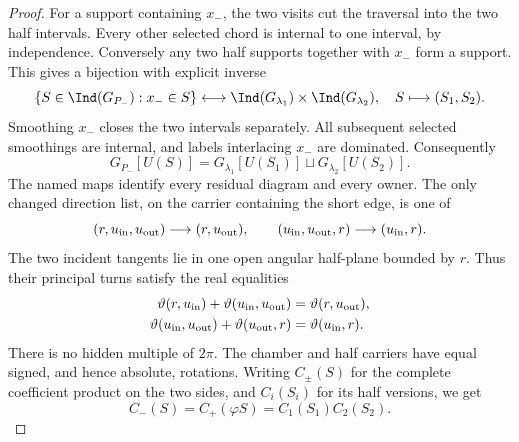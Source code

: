 \begin{proof}
For a support containing $x_-$, the two visits cut the traversal into
the two half intervals.  Every other selected chord is internal to one
interval, by independence.  Conversely any two half supports together
with $x_-$ form a support.  This gives a bijection with explicit inverse
\begin{equation}\label{s7c:sliding-bijection}
 \{S\in\Ind(G_{P_-}):x_-\in S\}\longleftrightarrow
 \Ind(G_{\lambda_1})\times\Ind(G_{\lambda_2}),
 \quad S\longmapsto(S_1,S_2).
\end{equation}
Smoothing $x_-$ closes the two intervals separately.  All subsequent
selected smoothings are internal, and labels interlacing $x_-$ are
dominated.  Consequently
\begin{equation}\label{s7c:sliding-residual}
 G_{P_-}[U(S)]
 =G_{\lambda_1}[U(S_1)]\sqcup G_{\lambda_2}[U(S_2)].
\end{equation}
The named maps identify every residual diagram and every owner.  The
only changed direction list, on the carrier containing the short edge,
is one of
\begin{equation}\label{s7c:short-direction-lists}
 (r,u_{\rm in},u_{\rm out})\longrightarrow(r,u_{\rm out}),
 \qquad
 (u_{\rm in},u_{\rm out},r)\longrightarrow(u_{\rm in},r).
\end{equation}
The two incident tangents lie in one open angular half-plane bounded by
$r$.  Thus their principal turns satisfy the real equalities
\begin{align}
 \vartheta(r,u_{\rm in})+\vartheta(u_{\rm in},u_{\rm out})
       &=\vartheta(r,u_{\rm out}),\label{s7c:turn-short-a}\\
 \vartheta(u_{\rm in},u_{\rm out})+\vartheta(u_{\rm out},r)
       &=\vartheta(u_{\rm in},r).\label{s7c:turn-short-b}
\end{align}
There is no hidden multiple of $2\pi$.  The chamber and half carriers
have equal signed, and hence absolute, rotations.  Writing $C_\pm(S)$
for the complete coefficient product on the two sides, and $C_i(S_i)$
for its half versions, we get
\begin{equation}\label{s7c:sliding-coefficients}
 C_-(S)=C_+(\varphi S)=C_1(S_1)C_2(S_2).
\end{equation}


\end{proof}
